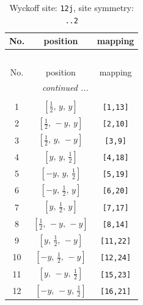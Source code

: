 \documentclass[fleqn,8pt]{jsarticle}
\begin{document}
\begin{longtable}{ccc}
\caption{Wyckoff site: {\tt 12j}, site symmetry: {\tt ..2}}
 \\
 \hline \hline
No. & position & mapping \\ \hline \endfirsthead

\multicolumn{2}{l}{\tablename\ \thetable{}} \\
 \hline \hline
No. & position & mapping \\ \hline \endhead

 \hline \hline
\multicolumn{2}{r}{\footnotesize\it continued ...} \\ \endfoot

 \hline \hline
\multicolumn{2}{r}{} \\ \endlastfoot

1 & $\left[ \frac{1}{2},\, y,\, y \right]$ & {\tt [1,13]} \\ \hline
2 & $\left[ \frac{1}{2},\, - y,\, y \right]$ & {\tt [2,10]} \\ \hline
3 & $\left[ \frac{1}{2},\, y,\, - y \right]$ & {\tt [3,9]} \\ \hline
4 & $\left[ y,\, y,\, \frac{1}{2} \right]$ & {\tt [4,18]} \\ \hline
5 & $\left[ - y,\, y,\, \frac{1}{2} \right]$ & {\tt [5,19]} \\ \hline
6 & $\left[ - y,\, \frac{1}{2},\, y \right]$ & {\tt [6,20]} \\ \hline
7 & $\left[ y,\, \frac{1}{2},\, y \right]$ & {\tt [7,17]} \\ \hline
8 & $\left[ \frac{1}{2},\, - y,\, - y \right]$ & {\tt [8,14]} \\ \hline
9 & $\left[ y,\, \frac{1}{2},\, - y \right]$ & {\tt [11,22]} \\ \hline
10 & $\left[ - y,\, \frac{1}{2},\, - y \right]$ & {\tt [12,24]} \\ \hline
11 & $\left[ y,\, - y,\, \frac{1}{2} \right]$ & {\tt [15,23]} \\ \hline
12 & $\left[ - y,\, - y,\, \frac{1}{2} \right]$ & {\tt [16,21]} \\
\end{longtable}
\renewcommand{\arraystretch}{1.2}
\end{document}
